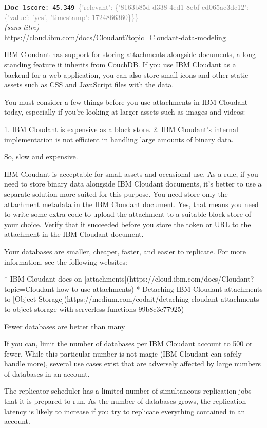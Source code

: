 \documentclass[a4paper,11pt]{article}
\begin{document}
\begin{docenv}
{\footnotesize\textcolor{doccolor}{\textbf{Doc~1}}}\hfill{\tiny\texttt{score:~45.349}}\ {\tiny\textcolor{gray}{\{'relevant': \{'8163b85d-d338-4ed1-8ebf-cd065ac3dc12': \{'value': 'yes', 'timestamp': 1724866360\}\}\}}}\\[3pt]
{\small\textit{(sans titre)}}\\[2pt]
{\tiny\url{https://cloud.ibm.com/docs/Cloudant?topic=Cloudant-data-modeling}}\\[4pt]
{\footnotesize 
IBM Cloudant has support for storing attachments alongside documents, a long-standing feature it inherits from CouchDB. If you use IBM Cloudant as a backend for a web application, you can also store small icons and other static assets such as CSS and JavaScript files with the data.

You must consider a few things before you use attachments in IBM Cloudant today, especially if you’re looking at larger assets such as images and videos:



1. IBM Cloudant is expensive as a block store.
2. IBM Cloudant’s internal implementation is not efficient in handling large amounts of binary data.



So, slow and expensive.

IBM Cloudant is acceptable for small assets and occasional use. As a rule, if you need to store binary data alongside IBM Cloudant documents, it’s better to use a separate solution more suited for this purpose. You need store only the attachment metadata in the IBM Cloudant document. Yes, that means you need to write some extra code to upload the attachment to a suitable block store of your choice. Verify that it succeeded before you store the token or URL to the attachment in the IBM Cloudant document.

Your databases are smaller, cheaper, faster, and easier to replicate. For more information, see the following websites:



* IBM Cloudant docs on [attachments](https://cloud.ibm.com/docs/Cloudant?topic=Cloudant-how-to-use-attachments)
* Detaching IBM Cloudant attachments to [Object Storage](https://medium.com/codait/detaching-cloudant-attachments-to-object-storage-with-serverless-functions-99b8c3c77925)







 Fewer databases are better than many 

If you can, limit the number of databases per IBM Cloudant account to 500 or fewer. While this particular number is not magic (IBM Cloudant can safely handle more), several use cases exist that are adversely affected by large numbers of databases in an account.

The replicator scheduler has a limited number of simultaneous replication jobs that it is prepared to run. As the number of databases grows, the replication latency is likely to increase if you try to replicate everything contained in an account.}
\end{docenv}
\end{document}
